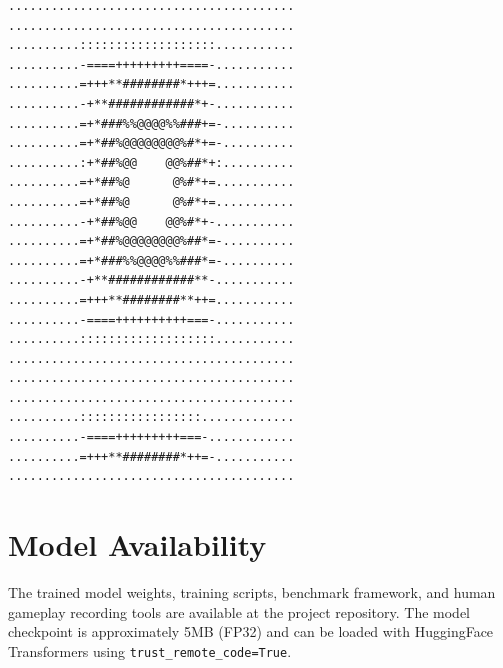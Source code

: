 \documentclass[11pt,a4paper]{article}
\begin{document}
\begin{lstlisting}[basicstyle=\scriptsize\ttfamily,frame=single]
........................................
........................................
..........:::::::::::::::::::...........
..........-====+++++++++====-...........
..........=+++**########*+++=...........
..........-+**############*+-...........
..........=+*###%%@@@@%%###+=-..........
..........=+*##%@@@@@@@@%#*+=-..........
..........:+*##%@@    @@%##*+:..........
..........=+*##%@      @%#*+=...........
..........=+*##%@      @%#*+=...........
..........-+*##%@@    @@%#*+-...........
..........=+*##%@@@@@@@@%##*=-..........
..........=+*###%%@@@@%%###*=-..........
..........-+**############**-...........
..........=+++**########**++=...........
..........-====++++++++++===-...........
..........:::::::::::::::::::...........
........................................
........................................
........................................
..........:::::::::::::::::.............
..........-====+++++++++===-............
..........=+++**########*++=-...........
........................................
\end{lstlisting}

\section{Model Availability}
\label{app:availability}

The trained model weights, training scripts, benchmark framework, and human gameplay recording tools are available at the project repository. The model checkpoint is approximately 5MB (FP32) and can be loaded with HuggingFace Transformers using \texttt{trust\_remote\_code=True}.
\end{document}
